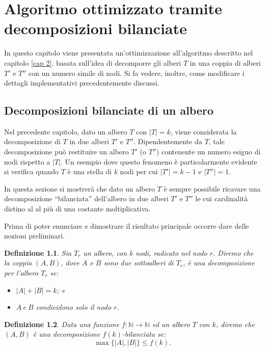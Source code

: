 \chapter{Algoritmo ottimizzato tramite decomposizioni bilanciate}
\label{cap:3}
In questo capitolo viene presentata un'ottimizzazione all'algoritmo descritto nel capitolo \ref{cap 2}. 
basata sull'idea di decomporre gli alberi $T$ in una coppia di alberi $T'$ e $T''$ con un numero simile di nodi.
Si fa vedere, inoltre, come modificare i dettagli implementativi precedentemente discussi.

\section{Decomposizioni bilanciate di un albero}
\label{cap:3 par:1}
Nel precedente capitolo, dato un albero $ T $ con $|T|=k$, viene considerata la decomposizione di $T$ in due alberi $ T' $ e $ T''$. 
Dipendentemente da $T$, tale decomposizione può restituire un albero $T'$ (o $T''$) contenente un numero esiguo di nodi rispetto a $|T|$.
Un esempio dove questo fenomeno è particolarmente evidente si verifica quando $T$ è una stella di $k$ nodi per cui $|T'|=k-1$ e $|T''|=1$.

In questa sezione si mostrerà che dato un albero $T$ \`e sempre possibile ricavare una decomposizione ``bilanciata'' dell'albero  in due alberi $ T' $ e $ T'' $ le cui cardinalit\`a distino al al più di una costante moltiplicativa.

Prima di poter enunciare e dimostrare il risultato principale occorre dare delle nozioni preliminari.

\newtheorem{definizione}{Definizione}[section]

\begin{definizione}
	\label{definizioneDeco} 
Sia $T_r$ un albero, con $k$ nodi, radicato nel nodo $r$.
Diremo che la coppia $(A,B)$, dove  $A$ e $B$ sono due sottoalberi di $T_r$, \`e una decomposizione per l'albero $ T_r $ se:
\begin{itemize}
	\item $| A | + | B | = k$; e
\item $A \ e \  B $ condividono solo il nodo $ r $.
\end{itemize}
\end{definizione}


\begin{definizione}
\label{lemmaDeco}
Data una funzione $f : \mathbb{N} \to \mathbb{N}$ ed un albero $ T $ con $ k $, diremo che $ (A,B) $ \`e una decomposizione $ f(k) $-bilanciata se:
\begin{equation*}
	\max{ \{|A| , |B| \} }  \le  f(k).
\end{equation*}
\end{definizione}



